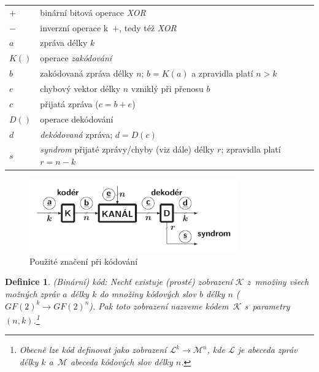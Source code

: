 \documentclass[thesis=M,czech,hidelinks]{FITthesis}[2012/06/26]
\newcommand{\0}{{\textcolor[gray]{0.75}{0}}}
\newtheorem{definice}{Definice}
\begin{document}
\begin{center}
\begin{tabular}{l p{10cm}}
    $+$     &   binární bitová operace \emph{XOR} \\
    $-$     &   inverzní operace k~$+$, tedy též \emph{XOR} \\
    $a$     &   zpráva délky $k$ \\
    $K()$   &   operace \emph{zakódování} \\
    $b$     &   zakódovaná zpráva délky $n$; $b=K(a)$ a zpravidla platí $n>k$ \\
    $e$     &   chybový vektor délky $n$ vzniklý při přenosu $b$ \\
    $c$     &   přijatá zpráva ($c=b+e$) \\
    $D()$   &   operace dekódování \\
    $d$     &   \emph{dekódovaná} zpráva; $d=D(c)$ \\
    $s$     &   \emph{syndrom} přijaté zprávy/chyby (viz dále) délky $r$;
                zpravidla platí $r=n-k$ \\
\end{tabular}
\end{center}

\begin{figure}
    \centering
    \includegraphics[width=0.8\textwidth]{materialy/aak-kodovani.png}
    \caption{Použité značení při kódování~\cite{FIT_AAK}}
    \label{obr_kodovani}
\end{figure}


\begin{definice}{(Binární) kód:}
    Nechť existuje (prosté) zobrazení $\mathcal{K}$ z~množiny všech možných
    zpráv $a$ délky $k$ do množiny kódových slov $b$ délky $n$
    ($GF(2)^k \rightarrow GF(2)^n$). Pak toto zobrazení nazveme
    kódem~$\mathcal{K}$ s~parametry $(n,k)$.\footnote{
        Obecně lze \emph{kód} definovat jako zobrazení $\mathcal{L}^k
        \rightarrow \mathcal{M}^n$, kde $\mathcal{L}$ je \emph{abeceda} zpráv
        délky $k$ a~$\mathcal{M}$ abeceda kódových slov délky $n$.
    }
\end{definice}
\end{document}
